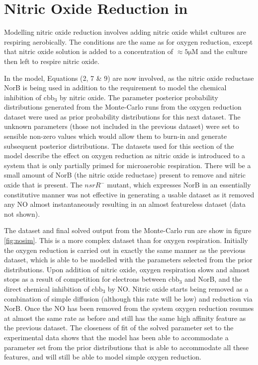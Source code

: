 \chapter{Nitric Oxide Reduction in \Nm{}}
\label{chap:noreduction}

Modelling nitric oxide reduction involves adding nitric oxide whilst cultures are respiring aerobically. The conditions are the same as for oxygen reduction, except that nitric oxide solution is added to a concentration of $\mathrm{\approx 5\mu M}$ and the culture then left to respire nitric oxide.

In the model, Equations (2, 7 \& 9) are now involved, as the nitric oxide reductase NorB is being used in addition to the requirement to model the chemical inhibition of $\mathrm{cbb}_3$ by nitric oxide. The parameter posterior probability distributions generated from the Monte-Carlo runs from the oxygen reduction dataset were used as prior probability distributions for this next dataset. The unknown parameters (those not included in the previous dataset) were set to sensible non-zero values which would allow them to burn-in and generate subsequent posterior distributions.
The datasets used for this section of the model describe the effect on oxygen reduction as nitric oxide is introduced to a system that is only partially primed for microaerobic respiration. There will be a small amount of NorB (the nitric oxide reductase) present to remove and nitric oxide that is present. The $\mathit{nsrR}^-$ mutant, which expresses NorB in an essentially constitutive manner was not effective in generating a usable dataset as it removed any NO almost instantaneously resulting in an almost featureless dataset (data not shown).

The dataset and final solved output from the Monte-Carlo run are show in figure \ref{fig:nosim}. This is a more complex dataset than for oxygen respiration. Initially the oxygen reduction is carried out in exactly the same manner as the previous dataset, which is able to be modelled with the parameters selected from the prior distributions. Upon addition of nitric oxide, oxygen respiration slows and almost stops as a result of competition for electrons between $\mathrm{cbb}_3$ and NorB, and the direct chemical inhibition of $\mathrm{cbb}_3$ by NO. Nitric oxide starts being removed as a combination of simple diffusion (although this rate will be low) and reduction via NorB. Once the NO has been removed from the system oxygen reduction resumes at almost the same rate as before and still has the same high affinity feature as the previous dataset. The closeness of fit of the solved parameter set to the experimental data shows that the model has been able to accommodate a parameter set from the prior distributions that is able to accommodate all these features, and will still be able to model simple oxygen reduction.

